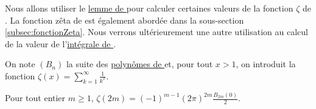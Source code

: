 %
%


\bigskip

Nous allons utiliser le \hyperref[lemmeLebesgue]{lemme de } pour calculer certaines valeurs de la fonction $\zeta$ de . La fonction zêta de  est également abordée dans la sous-section \ref{subsec:fonctionZeta}. Nous verrons ultérieurement une autre utilisation au calcul de la valeur de l'\hyperref[sec:intDirichlet]{intégrale de }.

On note $(B_n)$ la suite des \hyperref[sec:polynomes_de_bernoulli]{polynômes de } et, pour tout $x > 1$, on introduit la fonction $\zeta(x) = \sum\limits_{k=1}^{\infty} \frac{1}{k^x}$.

\begin{theo}
Pour tout entier $m \geqslant 1$, $\zeta(2m) = (-1)^{m-1} (2 \pi)^{2m} \frac{B_{2m}(0)}{2}$.
\end{theo}

